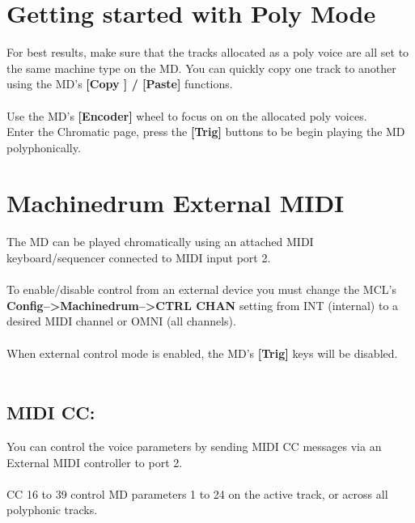 \section{Getting started with Poly Mode}
For best results, make sure that the tracks allocated as a poly voice are all set to the same machine type on the MD. You can quickly copy one track to another using the MD's \textbf{[Copy ] / [Paste]} functions.\\\\
Use the MD's \textbf{[Encoder]} wheel to focus on on the allocated poly voices.\\
Enter the Chromatic page, press the \textbf{[Trig]} buttons to be begin playing the MD polyphonically.
\section{Machinedrum External MIDI}
The MD can be played chromatically using an attached MIDI keyboard/sequencer connected to MIDI input port 2.\\\\
To enable/disable control from an external device you must change the MCL's \textbf{Config-->Machinedrum-->CTRL CHAN} setting from INT (internal) to a desired MIDI channel or OMNI (all channels).\\
\\
When external control mode is enabled, the MD's \textbf{[Trig]} keys will be disabled.\\\\
\subsection{MIDI CC:}
You can control the voice parameters by sending MIDI CC messages via an External MIDI controller to port 2.\\\\CC 16 to 39 control MD parameters 1 to 24 on the active track, or across all polyphonic tracks.

